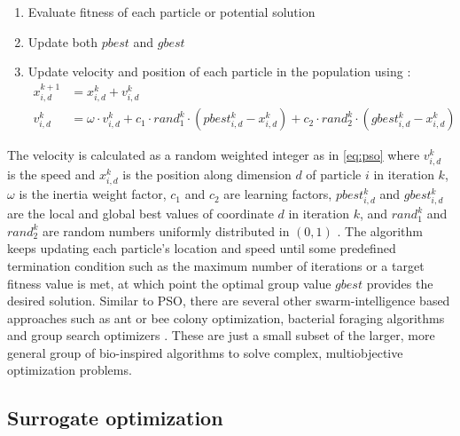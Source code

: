 \documentclass[final,3p,times]{elsarticle}
\begin{document}
\begin{enumerate}
    \item Evaluate fitness of each particle or potential solution
    \item Update both $pbest$ and $gbest$
    \item Update velocity and position of each particle in the population using \cite{wu2014}:
    \begin{align}
    \label{eq:pso}
        x_{i,d}^{k+1} & = x_{i,d}^{k} + v_{i,d}^{k} \\
        v_{i,d}^{k} & = \omega \cdot v_{i,d}^{k} + c_1 \cdot rand_1^k \cdot (pbest_{i,d}^k - x_{i,d}^{k}) + c_2 \cdot rand_2^k \cdot (gbest_{i,d}^k - x_{i,d}^k)
    \end{align}
\end{enumerate}

The velocity is calculated as a random weighted integer as in \cref{eq:pso} where $v_{i,d}^k$ is the speed and $x_{i,d}^k$ is the position along dimension $d$ of particle $i$ in iteration $k$, $\omega$ is the inertia weight factor, $c_1$ and $c_2$ are learning factors, $pbest_{i,d}^k$ and $gbest_{i,d}^k$ are the local and global best values of coordinate $d$ in iteration $k$, and $rand_1^k$ and $rand_2^k$ are random numbers uniformly distributed in $(0,1)$ \cite{wu2014}. The algorithm keeps updating each particle's location and speed until some predefined termination condition such as the maximum number of iterations or a target fitness value is met, at which point the optimal group value $gbest$ provides the desired solution. Similar to PSO, there are several other swarm-intelligence based approaches such as ant or bee colony optimization, bacterial foraging algorithms and group search optimizers \cite{pathak2017}. These are just a small subset of the larger, more general group of bio-inspired algorithms to solve complex, multiobjective optimization problems.

\subsection{Surrogate optimization}
\end{document}
